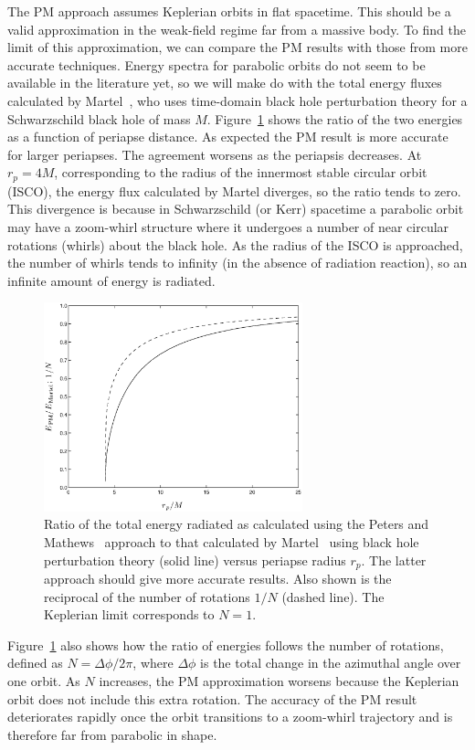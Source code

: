 \documentclass[aps,prd,amsfonts,amssymb,amsmath,nofootinbib,floatfix,reprint,showpacs,groupedaddress]{revtex4-1}
\newcommand{\Figref}[1]{Figure~\ref{fig:#1}}
\begin{document}
The PM approach assumes Keplerian orbits in flat spacetime. This should be a valid approximation in the weak-field regime far from a massive body. To find the limit of this approximation, we can compare the PM results with those from more accurate techniques. Energy spectra for parabolic orbits do not seem to be available in the literature yet, so we will make do with the total energy fluxes calculated by Martel~\cite{Martel2004a}, who uses time-domain black hole perturbation theory for a Schwarzschild black hole of mass $M$. \Figref{Ratio} shows the ratio of the two energies as a function of periapse distance. As expected the PM result is more accurate for larger periapses. The agreement worsens as the periapsis decreases. At $r_{p} = 4 M$, corresponding to the radius of the innermost stable circular orbit (ISCO), the energy flux calculated by Martel diverges, so the ratio tends to zero. This divergence is because in Schwarzschild (or Kerr) spacetime a parabolic orbit may have a zoom-whirl structure where it undergoes a number of near circular rotations (whirls) about the black hole. As the radius of the ISCO is approached, the number of whirls tends to infinity (in the absence of radiation reaction), so an infinite amount of energy is radiated.
\begin{figure}
\includegraphics[width=75mm]{Ratio_2.eps}
\caption{Ratio of the total energy radiated as calculated using the Peters and Mathews~\cite{Peters1963} approach to that calculated by Martel~\cite{Martel2004a} using black hole perturbation theory (solid line) versus periapse radius $r_{p}$. The latter approach should give more accurate results. Also shown is the reciprocal of the number of rotations $1/N$ (dashed line). The Keplerian limit corresponds to $N = 1$.\label{fig:Ratio}}
\end{figure}
\Figref{Ratio} also shows how the ratio of energies follows the number of rotations, defined as $N = {\Delta \phi}/{2\pi}$, where $\Delta \phi$ is the total change in the azimuthal angle over one orbit. As $N$ increases, the PM approximation worsens because the Keplerian orbit does not include this extra rotation. The accuracy of the PM result deteriorates rapidly once the orbit transitions to a zoom-whirl trajectory and is therefore far from parabolic in shape.
\end{document}
